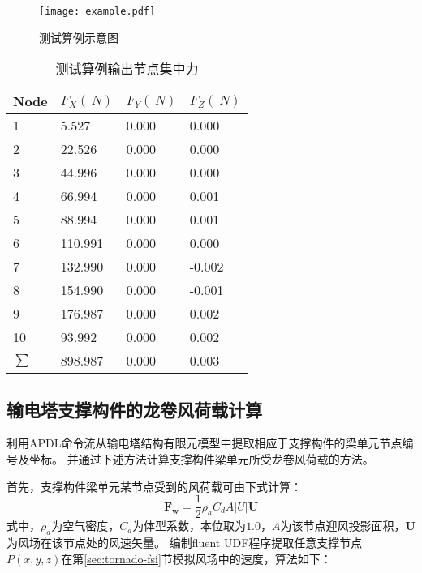 \begin{figure}[!htbp]
	\centering
	\texttt{[image: example.pdf]}
	\caption{测试算例示意图}
	\label{fig:example}
\end{figure}

\begin{table}[!htbp]
	\caption{测试算例输出节点集中力}
	\label{tab:example-force}
	\centering
	\begin{tabu} to 1.0\textwidth {X[c] X[2,c] X[2,c] X[2,c]}
		\toprule
		Node   & $F_X(\SI{}{N})$ & $F_Y(\SI{}{N})$ & $F_Z(\SI{}{N})$ \\
		      & 5.527           & 0.000           & 0.000           \\
		2      & 22.526          & 0.000           & 0.000           \\
		3      & 44.996          & 0.000           & 0.000           \\
		4      & 66.994          & 0.000           & 0.001           \\
		5      & 88.994          & 0.000           & 0.001           \\
		6      & 110.991         & 0.000           & 0.000           \\
		7      & 132.990         & 0.000           & -0.002          \\
		8      & 154.990         & 0.000           & -0.001          \\
		9      & 176.987         & 0.000           & 0.002           \\
		10     & 93.992          & 0.000           & 0.002           \\
		$\sum$ & 898.987         & 0.000           & 0.003           \\
		\bottomrule
	\end{tabu}
\end{table}

\subsection{输电塔支撑构件的龙卷风荷载计算}

利用APDL命令流从输电塔结构有限元模型中提取相应于支撑构件的梁单元节点编号及坐标。
并通过下述方法计算支撑构件梁单元所受龙卷风荷载的方法。

首先，支撑构件梁单元某节点受到的风荷载可由下式计算\cite{savory2001modelling}：
\begin{equation}
	\bm{F_w} = \frac{1}{2} \rho_a C_d A |U| \bm{U}
\end{equation}
式中，$\rho_a$为空气密度，$C_d$为体型系数，本位取为$1.0$，$A$为该节点迎风投影面积，$\bm{U}$为风场在该节点处的风速矢量。
编制fluent UDF程序提取任意支撑节点$P(x, y, z)$在第\ref{sec:tornado-fsi}节模拟风场中的速度，算法如下：

